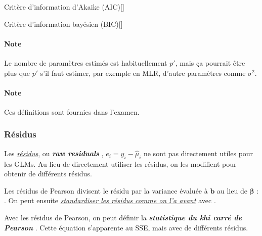 \documentclass[french]{article}
\begin{document}
\begin{multicols*}{2}
\begin{definitionGENERAL}{Critère d'information d'Akaike (AIC)}[]
\end{definitionGENERAL}

\begin{definitionGENERAL}{Critère d'information bayésien (BIC)}[]
\end{definitionGENERAL}

\paragraph{Note}	Le nombre de paramètres estimés est habituellement $p'$, mais ça pourrait être plus que $p'$ s'il faut estimer, par exemple en MLR, d'autre paramètres comme $\sigma^{2}$.

\paragraph{Note}	Ces définitions sont fournies dans l'examen.


\subsubsection{Résidus}
\begin{rappel_enhanced}[Contexte]
Les \textit{\color{bleudefrance}\underline{\hyperlink{rawResidual}{\color{bleudefrance} résidus}}}, ou \og \textit{\textbf{raw residuals}} \fg{}, $e_{i} = y_{i} - \hat{\mu}_{i}$ ne sont pas directement utiles pour les GLMs. Au lieu de directement utiliser les résidus, on les modifient pour obtenir de différents résidus.
\end{rappel_enhanced}


\begin{definitionNOHFILL}
Les résidus de Pearson divisent le résidu par la variance évaluée à $\bm{b}$ au lieu de $\bm{\beta}$ : . On peut ensuite \textit{\color{bleudefrance}\underline{\hyperlink{standResid}{\color{bleudefrance} standardiser les résidus comme on l'a avant}}} avec .


\begin{definitionNOHFILLsub}
Avec les résidus de Pearson, on peut définir la \textbf{\textit{statistique du khi carré de Pearson}} . Cette équation s'apparente au SSE, mais avec de différents résidus.
\end{definitionNOHFILLsub}
\end{definitionNOHFILL}



\end{multicols*}
\end{document}
